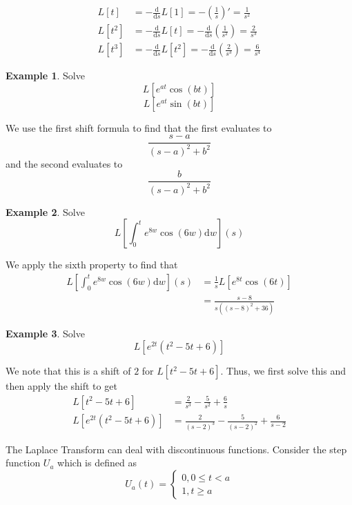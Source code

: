 \documentclass[11pt]{article}
\theoremstyle{plain} %
\theoremstyle{definition}
\theoremstyle{example}
\newtheorem*{example}{Example}
\theoremstyle{remark}
\begin{document}
\begin{align*}
	L[t] &= -\frac{\mathrm d }{\mathrm d s}L[1] = -\left(\frac{1}{s}\right)' = \frac{1}{s^2} \\
	L\left[t^2\right] &= -\frac{\mathrm d }{\mathrm d s} L[t] =  -\frac{\mathrm d }{\mathrm d s}\left(\frac{1}{s^2}\right) = \frac{2}{s^3} \\
	L\left[t^3\right] &=  -\frac{\mathrm d }{\mathrm d s} L\left[t^2\right] =  -\frac{\mathrm d }{\mathrm d s}\left(\frac{2}{s^3}\right) = \frac{6}{s^4}
\end{align*}

\begin{example}
Solve $$L\left[e^{at}\cos(bt)\right]$$
$$L\left[e^{at}\sin(bt)\right]$$
\end{example}

We use the first shift formula to find that the first evaluates to $$\frac{s-a}{(s-a)^2 + b^2}$$ and the second evaluates to $$\frac{b}{(s-a)^2+b^2}$$


\begin{example}
	Solve $$L\left[\int_0^t e^{8w}\cos(6w)\mathrm d w\right](s)$$
\end{example}

We apply the sixth property to find that 
\begin{align*}
	L\left[\int_0^t e^{8w}\cos(6w)\mathrm d w\right](s) &= \frac{1}{s}L\left[e^{8t}\cos(6t)\right] \\
	&= \frac{s-8}{s\left((s-8)^2+36\right)}
\end{align*}



\begin{example}
Solve $$L\left[e^{2t}\left(t^2-5t+6\right)\right]$$
\end{example}

We note that this is a shift of $2$ for $L\left[t^2-5t+6\right]$. Thus, we first solve this and then apply the shift to get
\begin{align*}
	L\left[t^2-5t+6\right] &= \frac{2}{s^3} -\frac{5}{s^2} + \frac{6}{s} \\
	L\left[e^{2t}\left(t^2-5t+6\right)\right]  &=  \frac{2}{(s-2)^3} -\frac{5}{(s-2)^2} + \frac{6}{s-2}
\end{align*}

The Laplace Transform can deal with discontinuous functions. Consider the step function $U_a$ which is defined as $$U_a(t) = \begin{cases} 0, 0 \leq t < a \\ 1, t \geq a \end{cases}$$
\end{document}
